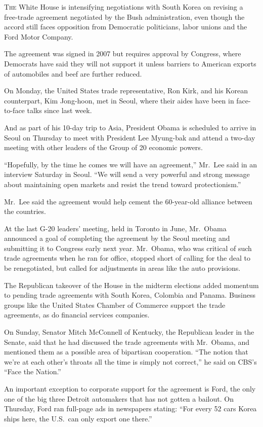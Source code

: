 ﻿\documentclass[12pt]{article}
\begin{document}
\lettrine{T}{he} White House is intensifying negotiations with South Korea
on revising a free-trade agreement negotiated by the Bush administration, even though the accord
still faces opposition from Democratic politicians, labor unions and the Ford Motor Company.

The agreement was signed in 2007 but requires approval by Congress, where Democrats have said they
will not support it unless barriers to American exports of automobiles and beef are further reduced.

On Monday, the United States trade representative, Ron Kirk, and his Korean counterpart, Kim
Jong-hoon, met in Seoul, where their aides have been in face-to-face talks since last week.

And as part of his 10-day trip to Asia, President Obama is scheduled to arrive in Seoul on Thursday
to meet with President Lee Myung-bak and attend a two-day meeting with other leaders of the Group of
20 economic powers.

``Hopefully, by the time he comes we will have an agreement,'' Mr.~Lee said in an interview Saturday
in Seoul. ``We will send a very powerful and strong message about maintaining open markets and
resist the trend toward protectionism.''

Mr.~Lee said the agreement would help cement the 60-year-old alliance between the countries.

At the last G-20 leaders' meeting, held in Toronto in June, Mr.~Obama announced a goal of completing
the agreement by the Seoul meeting and submitting it to Congress early next year. Mr.~Obama, who was
critical of such trade agreements when he ran for office, stopped short of calling for the deal to
be renegotiated, but called for adjustments in areas like the auto provisions.

The Republican takeover of the House in the midterm elections added momentum to pending trade
agreements with South Korea, Colombia and Panama. Business groups like the United States Chamber of
Commerce support the trade agreements, as do financial services companies.

On Sunday, Senator Mitch McConnell of Kentucky, the Republican leader in the Senate, said that he
had discussed the trade agreements with Mr.~Obama, and mentioned them as a possible area of
bipartisan cooperation. ``The notion that we're at each other's throats all the time is simply not
correct,'' he said on CBS's ``Face the Nation.''

An important exception to corporate support for the agreement is Ford, the only one of the big three
Detroit automakers that has not gotten a bailout. On Thursday, Ford ran full-page ads in newspapers
stating: ``For every 52 cars Korea ships here, the U.S.~can only export one there.''
\end{document}
